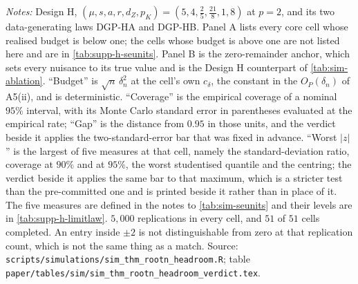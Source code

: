 \documentclass[
  12pt]{article}
\newcommand{\1}[1]{\mathds{1}\left[#1\right]}
\theoremstyle{plain}
\theoremstyle{definition}
\theoremstyle{definition}
\theoremstyle{remark}
\begin{document}
%
%
%
\begin{table}
\centering
\begin{threeparttable}
\caption{The headroom experiment against the criterion fixed before it ran}
\label{tab:sim-h-verdict}
\scriptsize

\begin{tablenotes}\footnotesize
\item \textit{Notes:} Design H, $(\mu,s,a,r,d_Z,p_K)=(5,4,\tfrac25,
\tfrac{21}{8},1,8)$ at $p=2$, and its two data-generating laws DGP-HA and
DGP-HB. Panel A lists every core cell whose realised budget is below one; the
cells whose budget is above one are not listed here and are in \cref{tab:supp-h-seunits}. Panel B is the zero-remainder anchor, which sets every nuisance to
its true value and is the Design H counterpart of \cref{tab:sim-ablation}.
``Budget'' is $\sqrt n\,\delta_n^{2}$ at the cell's own $c_\delta$, the constant
in the $O_P(\delta_n)$ of A5(ii), and is deterministic. ``Coverage'' is the
empirical coverage of a nominal $95\%$ interval, with its Monte Carlo standard
error in parentheses evaluated at the empirical rate; ``Gap'' is the distance
from $0.95$ in those units, and the verdict beside it applies the
two-standard-error bar that was fixed in advance. ``Worst $|z|$'' is the largest
of five measures at that cell, namely the standard-deviation ratio, coverage at
$90\%$ and at $95\%$, the worst studentised quantile and the centring; the
verdict beside it applies the same bar to that maximum, which is a stricter test
than the pre-committed one and is printed beside it rather than in place of it.
The five measures are defined in the notes to \cref{tab:sim-seunits} and their
levels are in \cref{tab:supp-h-limitlaw}. $5{,}000$ replications in every cell,
and $51$ of $51$ cells completed. An entry inside $\pm2$ is not distinguishable
from zero at that replication count, which is not the same thing as a match.
Source: \texttt{scripts/simulations/sim\_thm\_rootn\_headroom.R}; table
\texttt{paper/tables/sim/sim\_thm\_rootn\_headroom\_verdict.tex}.
\end{tablenotes}
\end{threeparttable}
\end{table}
\end{document}
